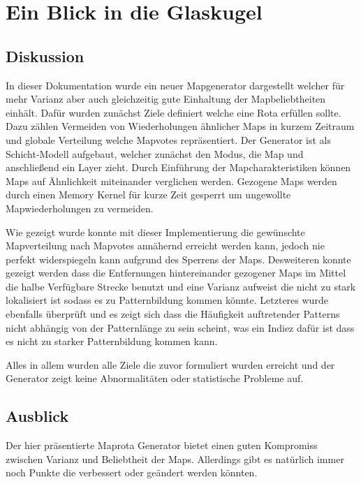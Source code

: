 \section{Ein Blick in die Glaskugel}
    \subsection{Diskussion}
    	In dieser Dokumentation wurde ein neuer Mapgenerator dargestellt welcher für mehr Varianz aber auch gleichzeitig gute Einhaltung der Mapbeliebtheiten einhält.
        Dafür wurden zunächst Ziele definiert welche eine Rota erfüllen sollte. 
        Dazu zählen Vermeiden von Wiederholungen ähnlicher Maps in kurzem Zeitraum und globale Verteilung welche Mapvotes repräsentiert.
        Der Generator ist als Schicht-Modell aufgebaut, welcher zunächst den Modus, die Map und anschließend ein Layer zieht. 
        Durch Einführung der Mapcharakteristiken können Maps auf Ähnlichkeit miteinander verglichen werden.
        Gezogene Maps werden durch einen Memory Kernel für kurze Zeit gesperrt um ungewollte Mapwiederholungen zu vermeiden.
        
        Wie gezeigt wurde konnte mit dieser Implementierung die gewünschte Mapverteilung nach Mapvotes annähernd erreicht werden kann, jedoch nie perfekt widerspiegeln kann aufgrund des Sperrens der Maps.
        Desweiteren konnte gezeigt werden dass die Entfernungen hintereinander gezogener Maps im Mittel die halbe Verfügbare Strecke benutzt und eine Varianz aufweist die nicht zu stark lokalisiert ist sodass es zu Patternbildung kommen könnte.
        Letzteres wurde ebenfalls überprüft und es zeigt sich dass die Häufigkeit auftretender Patterns nicht abhängig von der Patternlänge zu sein scheint, was ein Indiez dafür ist dass es nicht zu starker Patternbildung kommen kann. 

        Alles in allem wurden alle Ziele die zuvor formuliert wurden erreicht und der Generator zeigt keine Abnormalitäten oder statistische Probleme auf.

    \subsection{Ausblick}
        Der hier präsentierte Maprota Generator bietet einen guten Kompromiss zwischen Varianz und Beliebtheit der Maps. 
        Allerdings gibt es natürlich immer noch Punkte die verbessert oder geändert werden könnten.
        
